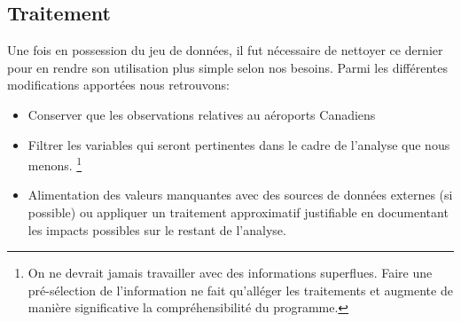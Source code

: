 \subsection{Traitement}
\label{subsec:Traitement}

Une fois en possession du jeu de données, il fut nécessaire de nettoyer ce dernier pour en rendre son utilisation plus simple selon nos besoins. Parmi les différentes modifications apportées nous retrouvons: \\
\begin{itemize}
	\item Conserver que les observations relatives au aéroports Canadiens
	\item Filtrer les variables qui seront pertinentes dans le cadre de l'analyse que nous menons. 
		\footnote{On ne devrait jamais travailler avec des informations superflues. Faire une pré-sélection de l'information ne fait qu'alléger les traitements et augmente de manière significative la compréhensibilité du programme.}
	\item Alimentation des valeurs manquantes avec des sources de données externes (si possible) ou appliquer un traitement approximatif justifiable en documentant les impacts possibles sur le restant de l'analyse.
\end{itemize}
\vspace{\baselineskip}

